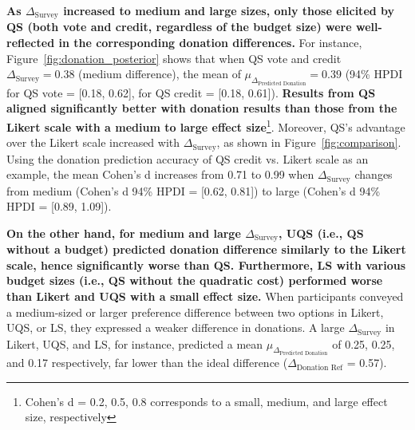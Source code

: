 \textbf{As $\Delta_{\text{Survey}}$ increased to medium and large sizes, only those elicited by QS (both vote and credit, regardless of the budget size) were well-reflected in the corresponding donation differences.} For instance, Figure~\ref{fig:donation_posterior} shows that when QS vote and credit $\Delta_{\text{Survey}} = 0.38$ (medium difference), the mean of $\mu_{\Delta_{\text{Predicted Donation}}} = 0.39$ (94\% HPDI for QS vote = [0.18, 0.62], for QS credit = [0.18, 0.61]). \textbf{Results from QS aligned significantly better with donation results than those from the Likert scale with a medium to large effect size}\footnote{Cohen's d = 0.2, 0.5, 0.8 corresponds to a small, medium, and large effect size, respectively}. Moreover, QS's advantage over the Likert scale increased with $\Delta_{\text{Survey}}$, as shown in Figure~\ref{fig:comparison}. Using the donation prediction accuracy of QS credit vs. Likert scale as an example, the mean Cohen's d increases from 0.71 to 0.99 when $\Delta_{\text{Survey}}$ changes from medium (Cohen's d 94\% HPDI = [0.62, 0.81]) to large (Cohen's d 94\% HPDI = [0.89, 1.09]).

\textbf{On the other hand, for medium and large $\Delta_{\text{Survey}}$, UQS (i.e., QS without a budget) predicted donation difference similarly to the Likert scale, hence significantly worse than QS. Furthermore, LS with various budget sizes (i.e., QS without the quadratic cost) performed worse than Likert and UQS with a small effect size.} When participants conveyed a medium-sized or larger preference difference between two options in Likert, UQS, or LS, they expressed a weaker difference in donations. A large $\Delta_{\text{Survey}}$ in Likert, UQS, and LS, for instance, predicted a mean $\mu_{\Delta_{\text{Predicted Donation}}}$ of 0.25, 0.25, and 0.17 respectively, far lower than the ideal difference ($\Delta_{\text{Donation Ref}}$ = 0.57).